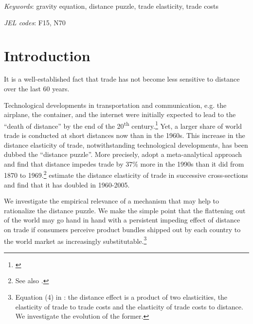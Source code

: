 \documentclass[12pt,twoside,a4paper,notitlepage]{article}
\begin{document}
\textit{Keywords}: gravity equation, distance puzzle, trade elasticity, trade costs

\textit{JEL codes}: F15, N70
\clearpage

\section*{Introduction}

It is a well-established fact that trade has not become less sensitive to distance over the last 60 years.

Technological developments in transportation and communication, e.g. the airplane, the container, and the internet were initially expected to lead to the ``death of distance'' by the end of the 20\textsuperscript{th} century.\footnote{\cite{Cairncross1997,Levinson2006,Friedman2007}}
Yet, a larger share of world trade is conducted at short distances now than in the 1960s.
This increase in the distance elasticity of trade, notwithstanding technological developments, has been dubbed the ``distance puzzle''.
More precisely, \cite{Disdier2008} adopt a meta-analytical approach and find that distance impedes trade by 37\% more in the 1990s than it did from 1870 to 1969.\footnote{See also \cite{Berthelon2008,Combes2006, Brun2005, Buch2004}.}
\cite{Head2013} estimate the distance elasticity of trade in successive cross-sections and find that it has doubled in 1960-2005.

We investigate the empirical relevance of a mechanism that may help to rationalize the distance puzzle.
We make the simple point that the flattening out of the world may go hand in hand with a persistent impeding effect of distance on trade if consumers perceive product bundles shipped out by each country to the world market as increasingly substitutable.\footnote{Equation (4) in \cite{Head2013}: the distance effect is a product of two elasticities, the elasticity of trade to trade costs and the elasticity of trade costs to distance.
We investigate the evolution of the former.}
\end{document}
